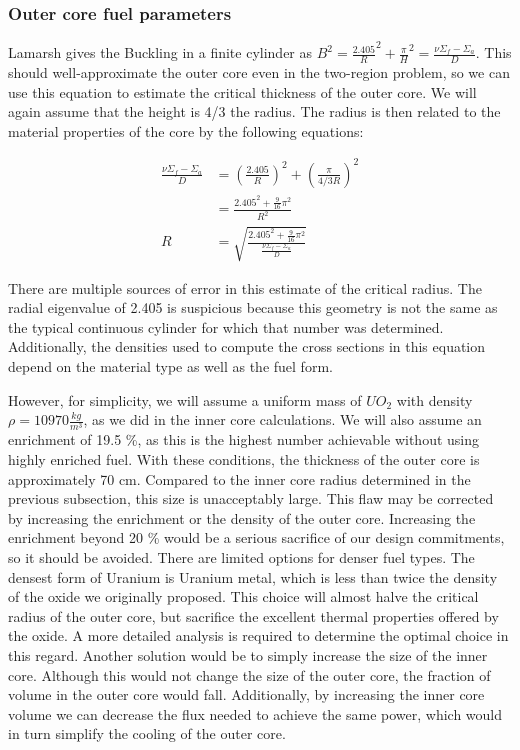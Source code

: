 \documentclass[12pt]{article}
\begin{document}
\subsubsection{Outer core fuel parameters}
Lamarsh gives the Buckling in a finite cylinder as $B^2 = \frac{2.405}{R}^2 + \frac{\pi}{H}^2 = \frac{\nu \Sigma_f - \Sigma_a}{D}$. This should well-approximate the outer core even in the two-region problem, so we can use this equation to estimate the critical thickness of the outer core. We will again assume that the height is 4/3 the radius. The radius is then related to the material properties of the core by the following equations:

\begin{align}
\frac{\nu \Sigma_f - \Sigma_a}{D} &=(\frac{2.405}{R})^2 + (\frac{\pi}{4/3 R})^2 \\
 &= \frac{2.405^2 + \frac{9}{16}\pi^2}{R^2} \\
R &= \sqrt{\frac{2.405^2 + \frac{9}{16}\pi^2} {\frac{\nu \Sigma_f - \Sigma_a}{D}}} \label{eq:outer-radius}
\end{align}

There are multiple sources of error in this estimate of the critical radius. The radial eigenvalue of 2.405 is suspicious because this geometry is not the same as the typical continuous cylinder for which that number was determined. Additionally, the densities used to compute the cross sections in this equation depend on the material type as well as the fuel form. 

However, for simplicity, we will assume a uniform mass of $UO_2$ with density $\rho =  10970 \frac{kg}{m^3}$, as we did in the inner core calculations. We will also assume an enrichment of 19.5 \%, as this is the highest number achievable without using highly enriched fuel. With these conditions, the thickness of the outer core is approximately 70 cm. Compared to the inner core radius determined in the previous subsection, this size is unacceptably large. This flaw may be corrected by increasing the enrichment or the density of the outer core. Increasing the enrichment beyond 20 \% would be a serious sacrifice of our design commitments, so it should be avoided.  There are limited options for denser fuel types. The densest form of Uranium is Uranium metal, which is less than twice the density of the oxide we originally proposed. This choice will almost halve the critical radius of the outer core, but sacrifice the excellent thermal properties offered by the oxide. A more detailed analysis is required to determine the optimal choice in this regard. Another solution would be to simply increase the size of the inner core. Although this would not change the size of the outer core, the fraction of volume in the outer core would fall. Additionally, by increasing the inner core volume we can decrease the flux needed to achieve the same power, which would in turn simplify the cooling of the outer core. 
\end{document}
